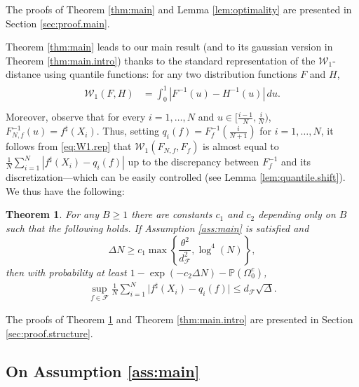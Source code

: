 \documentclass[11pt]{amsart}
\newcommand{\R}{\mathbb{R}}
\newcommand{\W}{\mathcal{W}}
\newtheorem{theorem}{Theorem}[section]
\theoremstyle{definition}
\renewcommand{\P}{\mathbb{P}}
\numberwithin{equation}{section}
\begin{document}
The proofs of Theorem \ref{thm:main} and Lemma \ref{lem:optimality} are presented in Section \ref{sec:proof.main}.


Theorem \ref{thm:main} leads to our main result (and to its gaussian version in Theorem \ref{thm:main.intro}) thanks to  the standard representation of the $\W_{1}$-distance using quantile functions: for any two distribution functions $F$ and $H$,
	\begin{align}
	\label{eq:W1.rep}
	\begin{split}
	\W_{1}(F,H)
	&= \int_{0}^{1} \left| F^{-1}(u) - H^{-1}(u)\right|\,du. \\ 
	\end{split}
	\end{align}
Moreover,  observe that for every $i=1,\dots, N$ and $u\in [\frac{i-1}{N}, \frac{i}{N})$, $F_{N,f}^{-1}(u) = f^{\sharp}(X_{i}) $.
Thus, setting $q_i(f) = F_f^{-1}(\frac{i}{N+1})$ for $i=1,\dots,N$, it follows from \eqref{eq:W1.rep} that $\mathcal{W}_1(F_{N,f},F_f) $ is almost equal to  $\frac{1}{N} \sum_{i=1}^N | f^\sharp(X_i) -  q_i(f)|$ up to the discrepancy between $F_f^{-1}$ and its discretization---which can be easily controlled (see Lemma \ref{lem:quantile.shift}).
We thus have the following:

\begin{tcolorbox}
\begin{theorem}
\label{thm:main.structure}
For any $B\geq 1$  there are constants $c_{1}$ and $c_{2}$ depending only on $B$ such that the following holds.
	If  Assumption \ref{ass:main} is satisfied and 
	\[   \Delta  N  \geq c_{1}  \max\left\{ \frac{ \theta^{2} }{d_{\mathcal{F}}^{2 }  } ,  \log^{4}(N ) \right\}, \]
	then with probability at least $1-\exp(- c_{2}\Delta N) - \P(\Omega_{0}^c)$,
\begin{align*}
\sup_{f\in\mathcal{F}} \frac{1}{N}\sum_{i=1}^N \big| f^\sharp(X_i)  - q_i(f)\big|
\le d_\mathcal{F} \sqrt{\Delta}.
\end{align*}
\end{theorem}
\end{tcolorbox}


The proofs of Theorem \ref{thm:main.structure} and Theorem \ref{thm:main.intro} are presented in Section \ref{sec:proof.structure}.

\subsection{On Assumption \ref{ass:main}}
\label{ref:intro.assumption}
\end{document}
